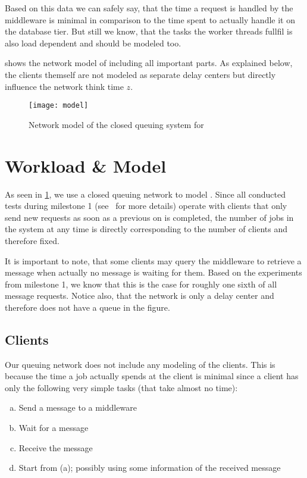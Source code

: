\documentclass[a4paper, oneside]{csthesis}
\begin{document}
    Based on this data we can safely say, that the time a request is handled by
    the middleware is minimal in comparison to the time spent to actually handle
    it on the database tier. But still we know, that the tasks the worker
    threads fullfil is also load dependent and should be modeled too.
    
     shows the network model of \telesto{} including all
    important parts. As explained below, the clients themself are not modeled as
    separate delay centers but directly influence the network think time $z$.

    \begin{figure}[t]
        \centering
            \texttt{[image: model]}
            \caption{Network model of the closed queuing system for \telesto}
            \label{fig:globalModel}
    \end{figure}

\section{Workload \& Model}
    As seen in \cref{fig:globalModel}, we use a closed queuing network to model
    \telesto. Since all conducted tests during milestone 1
    (see~\cite{asl:telesto} for more details) operate with clients that only
    send new requests as soon as a previous on is completed, the number of jobs
    in the system at any time is directly corresponding to the number of clients
    and therefore fixed.
    
    It is important to note, that some clients may query the middleware to
    retrieve a message when actually no message is waiting for them. Based on
    the experiments from milestone 1, we know that this is the case for roughly
    one sixth of all message requests. Notice also, that the network is only a
    delay center and therefore does not have a queue in the figure.

\subsection{Clients}
    Our queuing network does not include any modeling of the clients. This is
    because the time a job actually spends at the client is minimal since a
    client has only the following very simple tasks (that take almost no time):
    
    \begin{enumerate}[(a)]
        \item Send a message to a middleware
        \item Wait for a message
        \item Receive the message
        \item Start from (a); possibly using some information of the received
        message
    \end{enumerate}
\end{document}
